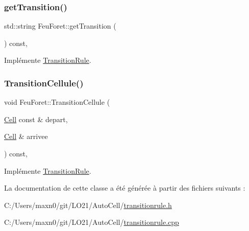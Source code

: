 \subsubsection{\texorpdfstring{get\+Transition()}{getTransition()}}
{\footnotesize\ttfamily std\+::string Feu\+Foret\+::get\+Transition (\begin{DoxyParamCaption}{ }\end{DoxyParamCaption}) const\hspace{0.3cm}{\ttfamily [override]}, {\ttfamily [virtual]}}



Implémente \mbox{\hyperlink{class_transition_rule_af537bee6cca486c754ee94855242328c}{Transition\+Rule}}.

\mbox{\label{class_feu_foret_a1fb3642690cc586faf0cbc6e9fae64cf}} 
\subsubsection{\texorpdfstring{Transition\+Cellule()}{TransitionCellule()}}
{\footnotesize\ttfamily void Feu\+Foret\+::\+Transition\+Cellule (\begin{DoxyParamCaption}\item[{\mbox{\hyperlink{class_cell}{Cell}} const \&}]{depart,  }\item[{\mbox{\hyperlink{class_cell}{Cell}} \&}]{arrivee }\end{DoxyParamCaption}) const\hspace{0.3cm}{\ttfamily [override]}, {\ttfamily [virtual]}}



Implémente \mbox{\hyperlink{class_transition_rule_a2b82a75ef494adc91b28755d55666e7a}{Transition\+Rule}}.



La documentation de cette classe a été générée à partir des fichiers suivants \+:\begin{DoxyCompactItemize}
\item 
C\+:/\+Users/maxn0/git/\+L\+O21/\+Auto\+Cell/\mbox{\hyperlink{transitionrule_8h}{transitionrule.\+h}}\item 
C\+:/\+Users/maxn0/git/\+L\+O21/\+Auto\+Cell/\mbox{\hyperlink{transitionrule_8cpp}{transitionrule.\+cpp}}\end{DoxyCompactItemize}
